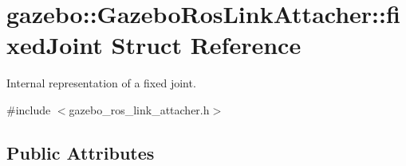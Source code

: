 \hypertarget{structgazebo_1_1GazeboRosLinkAttacher_1_1fixedJoint}{}\section{gazebo\+:\+:Gazebo\+Ros\+Link\+Attacher\+:\+:fixed\+Joint Struct Reference}
\label{structgazebo_1_1GazeboRosLinkAttacher_1_1fixedJoint}


Internal representation of a fixed joint.  




{\ttfamily \#include $<$gazebo\+\_\+ros\+\_\+link\+\_\+attacher.\+h$>$}

\subsection*{Public Attributes}
